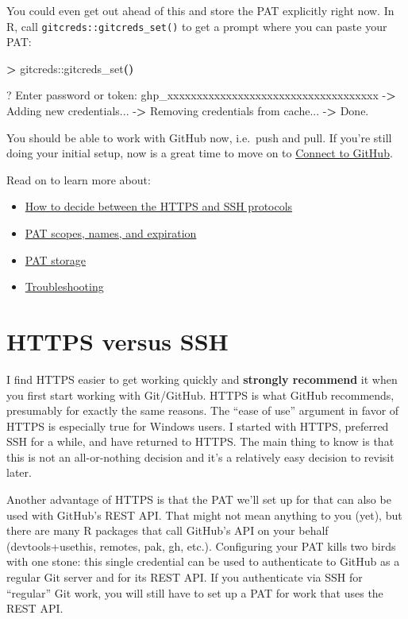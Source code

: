 \documentclass[
]{book}
\newenvironment{Shaded}{\begin{snugshade}}{\end{snugshade}}
\newcommand{\ExtensionTok}[1]{#1}
\newcommand{\KeywordTok}[1]{\textcolor[rgb]{0.13,0.29,0.53}{\textbf{#1}}}
\newcommand{\NormalTok}[1]{#1}
\newcommand{\OperatorTok}[1]{\textcolor[rgb]{0.81,0.36,0.00}{\textbf{#1}}}
\providecommand{\tightlist}{%
  \setlength{\itemsep}{0pt}\setlength{\parskip}{0pt}}
\begin{document}
You could even get out ahead of this and store the PAT explicitly right now.
In R, call \texttt{gitcreds::gitcreds\_set()} to get a prompt where you can paste your PAT:

\begin{Shaded}
\begin{Highlighting}[]
\OperatorTok{\textgreater{}}\NormalTok{ gitcreds::gitcreds\_set}\KeywordTok{()}

\ExtensionTok{?}\NormalTok{ Enter password or token: ghp\_xxxxxxxxxxxxxxxxxxxxxxxxxxxxxxxxxxxx}
\ExtensionTok{{-}}\OperatorTok{\textgreater{}}\NormalTok{ Adding new credentials...}
\ExtensionTok{{-}}\OperatorTok{\textgreater{}}\NormalTok{ Removing credentials from cache...}
\ExtensionTok{{-}}\OperatorTok{\textgreater{}}\NormalTok{ Done.}
\end{Highlighting}
\end{Shaded}

You should be able to work with GitHub now, i.e.~push and pull.
If you're still doing your initial setup, now is a great time to move on to \hyperref[push-pull-github]{Connect to GitHub}.

Read on to learn more about:

\begin{itemize}
\tightlist
\item
  \hyperref[https-vs-ssh]{How to decide between the HTTPS and SSH protocols}
\item
  \hyperref[get-a-pat]{PAT scopes, names, and expiration}
\item
  \hyperref[store-pat]{PAT storage}
\item
  \hyperref[pat-troubleshooting]{Troubleshooting}
\end{itemize}

\section{HTTPS versus SSH}\label{https-vs-ssh}

I find HTTPS easier to get working quickly and \textbf{strongly recommend} it when you first start working with Git/GitHub.
HTTPS is what GitHub recommends, presumably for exactly the same reasons.
The ``ease of use'' argument in favor of HTTPS is especially true for Windows users.
I started with HTTPS, preferred SSH for a while, and have returned to HTTPS.
The main thing to know is that this is not an all-or-nothing decision and it's a relatively easy decision to revisit later.

Another advantage of HTTPS is that the PAT we'll set up for that can also be used with GitHub's REST API.
That might not mean anything to you (yet), but there are many R packages that call GitHub's API on your behalf (devtools+usethis, remotes, pak, gh, etc.).
Configuring your PAT kills two birds with one stone: this single credential can be used to authenticate to GitHub as a regular Git server and for its REST API.
If you authenticate via SSH for ``regular'' Git work, you will still have to set up a PAT for work that uses the REST API.
\end{document}
